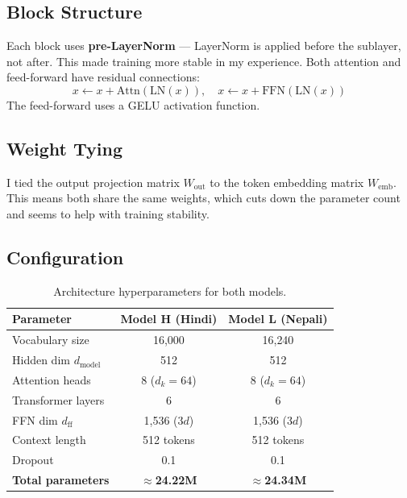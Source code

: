 \documentclass[11pt,a4paper]{article}
\begin{document}
\subsection{Block Structure}

Each block uses \textbf{pre-LayerNorm} --- LayerNorm is applied before the sublayer, not after. This made training more stable in my experience. Both attention and feed-forward have residual connections:
\[
    x \leftarrow x + \text{Attn}(\text{LN}(x)), \quad x \leftarrow x + \text{FFN}(\text{LN}(x))
\]
The feed-forward uses a GELU activation function.

\subsection{Weight Tying}
I tied the output projection matrix $W_{\text{out}}$ to the token embedding matrix $W_{\text{emb}}$. This means both share the same weights, which cuts down the parameter count and seems to help with training stability.

\subsection{Configuration}

\begin{table}[H]
\centering
\caption{Architecture hyperparameters for both models.}
\label{tab:arch}
\begin{tabular}{lcc}
\toprule
\textbf{Parameter} & \textbf{Model H (Hindi)} & \textbf{Model L (Nepali)} \\
\midrule
Vocabulary size       & 16{,}000  & 16{,}240  \\
Hidden dim $d_{\text{model}}$   & 512       & 512       \\
Attention heads       & 8 ($d_k = 64$) & 8 ($d_k = 64$) \\
Transformer layers    & 6         & 6         \\
FFN dim $d_{\text{ff}}$ & 1{,}536 ($3d$) & 1{,}536 ($3d$) \\
Context length        & 512 tokens & 512 tokens \\
Dropout               & 0.1       & 0.1       \\
\textbf{Total parameters} & \textbf{$\approx$24.22M} & \textbf{$\approx$24.34M} \\
\bottomrule
\end{tabular}
\end{table}

\end{document}
